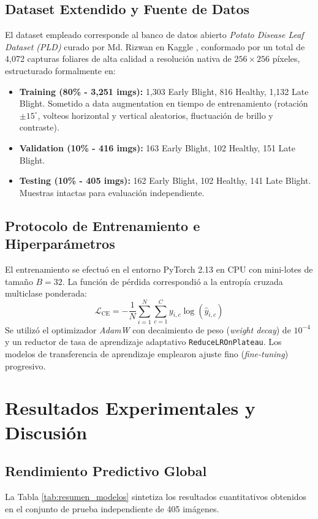 \documentclass[10pt,a4paper,twoside]{article}
\begin{document}
\subsection{Dataset Extendido y Fuente de Datos}
El dataset empleado corresponde al banco de datos abierto \textit{Potato Disease Leaf Dataset (PLD)} curado por Md. Rizwan en Kaggle \cite{rizwan2023potato}, conformado por un total de 4,072 capturas foliares de alta calidad a resolución nativa de $256 \times 256$ píxeles, estructurado formalmente en:
\begin{itemize}
    \item \textbf{Training (80\% - 3,251 imgs):} 1,303 Early Blight, 816 Healthy, 1,132 Late Blight. Sometido a data augmentation en tiempo de entrenamiento (rotación $\pm 15^\circ$, volteos horizontal y vertical aleatorios, fluctuación de brillo y contraste).
    \item \textbf{Validation (10\% - 416 imgs):} 163 Early Blight, 102 Healthy, 151 Late Blight.
    \item \textbf{Testing (10\% - 405 imgs):} 162 Early Blight, 102 Healthy, 141 Late Blight. Muestras intactas para evaluación independiente.
\end{itemize}

\subsection{Protocolo de Entrenamiento e Hiperparámetros}
El entrenamiento se efectuó en el entorno PyTorch 2.13 en CPU con mini-lotes de tamaño $B = 32$. La función de pérdida correspondió a la entropía cruzada multiclase ponderada:
\begin{equation}
\mathcal{L}_{\text{CE}} = -\frac{1}{N} \sum_{i=1}^N \sum_{c=1}^C y_{i,c} \log(\hat{y}_{i,c})
\end{equation}
Se utilizó el optimizador \textit{AdamW} \cite{kingma2014adam} con decaimiento de peso (\textit{weight decay}) de $10^{-4}$ y un reductor de tasa de aprendizaje adaptativo \texttt{ReduceLROnPlateau}. Los modelos de transferencia de aprendizaje emplearon ajuste fino (\textit{fine-tuning}) progresivo.

\section{Resultados Experimentales y Discusión}

\subsection{Rendimiento Predictivo Global}
La Tabla \ref{tab:resumen_modelos} sintetiza los resultados cuantitativos obtenidos en el conjunto de prueba independiente de 405 imágenes.
\end{document}

